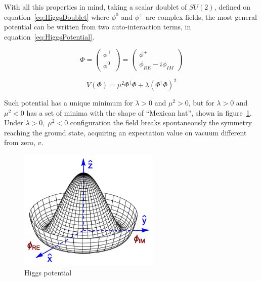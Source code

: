 With all this properties in mind, taking a scalar doublet of $SU(2)$, defined on equation~\ref{eq:HiggsDoublet} where $\phi^{0}$ and $\phi^{+}$ are complex fields, the most general potential can be written from two auto-interaction terms, in equation~\ref{eq:HiggsPotential}.

\begin{equation}
  \label{eq:HiggsDoublet}
  \Phi=\left(
    \begin{array}{c}
      \phi^{+} \\
      \phi^{0}
    \end{array}
  \right)=\left(
    \begin{array}{c}
      \phi^{+} \\
      \phi_{RE}-i\phi_{IM}
    \end{array}
  \right)
\end{equation}

\begin{equation}
  \label{eq:HiggsPotential}
  V(\Phi)=\mu^{2}\Phi^{\dagger}\Phi+\lambda(\Phi^{\dagger}\Phi)^{2}
\end{equation}

Such potential has a unique minimum for $\lambda>0$ and $\mu^{2}>0$, but for $\lambda>0$ and $\mu^{2}<0$ has a set of minima with the shape of ``Mexican hat'', shown in figure~\ref{fig:MexicanHat}. Under $\lambda>0,\;\mu^{2}<0$ configuration the field breaks spontaneously the symmetry reaching the ground state, acquiring an expectation value on vacuum different from zero, $v$. 

\begin{figure}[!Hhtbp]
  \begin{center}
    \includegraphics[width=0.6\textwidth]{figs/Mexican_hat.png}
    \caption{Higgs potential}
    \label{fig:MexicanHat}
  \end{center}
\end{figure}

